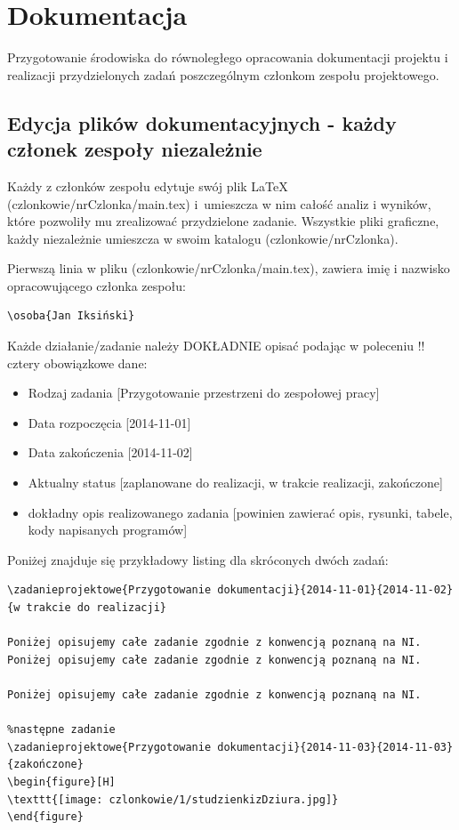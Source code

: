\section{Dokumentacja}
Przygotowanie środowiska do równoległego opracowania dokumentacji projektu i realizacji przydzielonych zadań poszczególnym członkom zespołu projektowego.

\subsection[Edycja plików dokumentacyjnych]{Edycja plików dokumentacyjnych - każdy członek zespoły niezależnie}
Każdy z członków zespołu edytuje swój plik \LaTeX{} (czlonkowie/nrCzlonka/main.tex) i~umieszcza w nim całość analiz i wyników, które pozwoliły mu zrealizować przydzielone zadanie. Wszystkie pliki graficzne, każdy niezależnie umieszcza w swoim katalogu (czlonkowie/nrCzlonka).

Pierwszą linia w pliku (czlonkowie/nrCzlonka/main.tex), zawiera imię i nazwisko opracowującego członka zespołu:
\begin{lstlisting}
\osoba{Jan Iksiński}
\end{lstlisting}

Każde działanie/zadanie należy DOKŁADNIE opisać podając w poleceniu \s!\zadanieprojektowe! cztery obowiązkowe dane:
\begin{itemize}
\item Rodzaj zadania [Przygotowanie przestrzeni do zespołowej pracy]
\item Data rozpoczęcia [2014-11-01]
\item Data zakończenia [2014-11-02]
\item Aktualny status [zaplanowane do realizacji, w trakcie realizacji, zakończone]
\item dokładny opis realizowanego zadania [powinien zawierać opis, rysunki, tabele, kody napisanych programów]
\end{itemize}

Poniżej znajduje się przykładowy listing dla skróconych dwóch zadań:
\begin{lstlisting}
\zadanieprojektowe{Przygotowanie dokumentacji}{2014-11-01}{2014-11-02}{w trakcie do realizacji}

Poniżej opisujemy całe zadanie zgodnie z konwencją poznaną na NI.
Poniżej opisujemy całe zadanie zgodnie z konwencją poznaną na NI.

Poniżej opisujemy całe zadanie zgodnie z konwencją poznaną na NI. 

%następne zadanie
\zadanieprojektowe{Przygotowanie dokumentacji}{2014-11-03}{2014-11-03}{zakończone}
\begin{figure}[H]
\texttt{[image: czlonkowie/1/studzienkizDziura.jpg]}
\end{figure}
\end{lstlisting}


